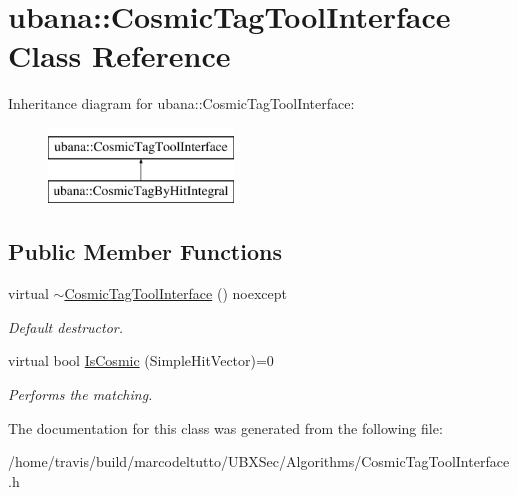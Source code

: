 \hypertarget{classubana_1_1CosmicTagToolInterface}{\section{ubana\-:\-:\-Cosmic\-Tag\-Tool\-Interface \-Class \-Reference}
\label{classubana_1_1CosmicTagToolInterface}
}
\-Inheritance diagram for ubana\-:\-:\-Cosmic\-Tag\-Tool\-Interface\-:\begin{figure}[H]
\begin{center}
\leavevmode
\includegraphics[height=2.000000cm]{classubana_1_1CosmicTagToolInterface}
\end{center}
\end{figure}
\subsection*{\-Public \-Member \-Functions}
\begin{DoxyCompactItemize}
\item 
\hypertarget{classubana_1_1CosmicTagToolInterface_a2c14c0575c5234efc433517b91b67683}{virtual \hyperlink{classubana_1_1CosmicTagToolInterface_a2c14c0575c5234efc433517b91b67683}{$\sim$\-Cosmic\-Tag\-Tool\-Interface} () noexcept}\label{classubana_1_1CosmicTagToolInterface_a2c14c0575c5234efc433517b91b67683}

\begin{DoxyCompactList}\small\item\em \-Default destructor. \end{DoxyCompactList}\item 
\hypertarget{classubana_1_1CosmicTagToolInterface_a5363b61b1dfab1e6b9cade4b3eed2c66}{virtual bool \hyperlink{classubana_1_1CosmicTagToolInterface_a5363b61b1dfab1e6b9cade4b3eed2c66}{\-Is\-Cosmic} (\-Simple\-Hit\-Vector)=0}\label{classubana_1_1CosmicTagToolInterface_a5363b61b1dfab1e6b9cade4b3eed2c66}

\begin{DoxyCompactList}\small\item\em \-Performs the matching. \end{DoxyCompactList}\end{DoxyCompactItemize}


\-The documentation for this class was generated from the following file\-:\begin{DoxyCompactItemize}
\item 
/home/travis/build/marcodeltutto/\-U\-B\-X\-Sec/\-Algorithms/\-Cosmic\-Tag\-Tool\-Interface.\-h\end{DoxyCompactItemize}
